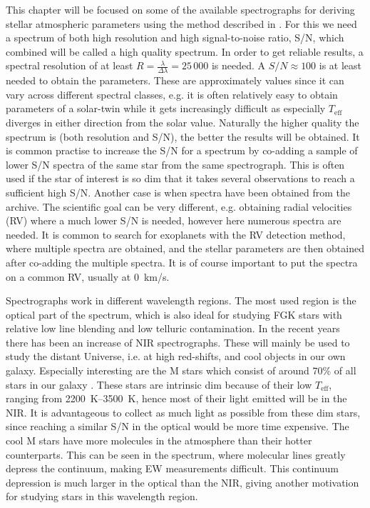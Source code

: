 This chapter will be focused on some of the available spectrographs for deriving stellar atmospheric
parameters using the method described in . For this we need a spectrum of both
high resolution and high signal-to-noise ratio, S/N, which combined will be called a high quality
spectrum. In order to get reliable results, a spectral resolution of at least
$R=\frac{\lambda}{\Delta\lambda}=25\,000$ is needed. A $S/N\approx 100$ is at least needed to obtain
the parameters. These are approximately values since it can vary across different spectral classes,
e.g. it is often relatively easy to obtain parameters of a solar-twin while it gets increasingly
difficult as especially $T_\mathrm{eff}$ diverges in either direction from the solar value.
Naturally the higher quality the spectrum is (both resolution and S/N), the better the results will
be obtained. It is common practise to increase the S/N for a spectrum by co-adding a sample of lower
S/N spectra of the same star from the same spectrograph. This is often used if the star of interest
is so dim that it takes several observations to reach a sufficient high S/N. Another case is when
spectra have been obtained from the archive. The scientific goal can be very different, e.g.
obtaining radial velocities (RV) where a much lower S/N is needed, however here numerous spectra are
needed. It is common to search for exoplanets with the RV detection method, where multiple spectra
are obtained, and the stellar parameters are then obtained after co-adding the multiple spectra. It
is of course important to put the spectra on a common RV, usually at \SI{0}{km/s}.

Spectrographs work in different wavelength regions. The most used region is the optical part of the
spectrum, which is also ideal for studying FGK stars with relative low line blending and low
telluric contamination. In the recent years there has been an increase of NIR spectrographs. These
will mainly be used to study the distant Universe, i.e. at high red-shifts, and cool objects in our
own galaxy. Especially interesting are the M stars which consist of around 70\% of all stars in our
galaxy \citep{Bochanski2010}. These stars are intrinsic dim because of their low $T_\mathrm{eff}$,
ranging from \SIrange{2200}{3500}{K}, hence most of their light emitted will be in the NIR. It is
advantageous to collect as much light as possible from these dim stars, since reaching a similar S/N
in the optical would be more time expensive. The cool M stars have more molecules in the atmosphere
than their hotter counterparts. This can be seen in the spectrum, where molecular lines greatly
depress the continuum, making EW measurements difficult. This continuum depression is much larger in
the optical than the NIR, giving another motivation for studying stars in this wavelength region.
